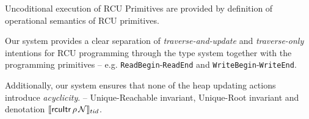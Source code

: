  Uncoditional execution of RCU Primitives are provided by definition of operational semantics of RCU primitives.

 Our system provides a clear separation of \textit{traverse-and-update} and \textit{traverse-only} intentions for \textsf{RCU} programming through the type system together with the programming primitives -- e.g. \lstinline|ReadBegin|-\lstinline|ReadEnd| and \lstinline|WriteBegin|-\lstinline|WriteEnd|.

 Additionally, our system ensures that none of the heap updating actions introduce \textit{acyclicity}.  -- \textsf{Unique-Reachable} invariant,  \textsf{Unique-Root} invariant and denotation $\llbracket \mathsf{rcuItr}\,\rho \,\mathcal{N} \rrbracket_{tid}$.
